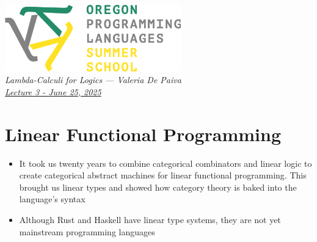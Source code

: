 \documentclass[11pt]{article}
\begin{document}
\thispagestyle{plain}
\begin{center}
\includegraphics[width=3in]{oplssLogo.png}\\[2\parskip]
\sffamily \LARGE \slshape Lambda-Calculi for Logics
--- \upshape Valeria De Paiva \\[2ex]
\href{https://github.com/vcvpaiva/DialecticaCategories/blob/master/OPLSS2025/OregonLecture3.pdf}{\large Lecture 3 - \slshape June 25, 2025}
\end{center}

\section{Linear Functional Programming}
\begin{itemize}
    \item It took us twenty years to combine categorical combinators and linear logic to create categorical abstract machines for linear functional programming. This brought us linear types and showed how category theory is baked into the language's syntax
    \item Although Rust and Haskell have linear type systems, they are not yet mainstream programming languages\cite{Bernardy2017LinearHaskell}
\end{itemize}
\end{document}
